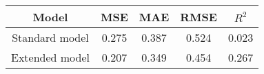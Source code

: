 \begin{tabular}{ccccc}
  \toprule
  \textbf{Model} & \textbf{MSE} & \textbf{MAE} & \textbf{RMSE} & \textbf{\(R^2\)} \\\midrule
  Standard model & 0.275 & 0.387 & 0.524 & 0.023 \\
  Extended model & 0.207 & 0.349 & 0.454 & 0.267 \\\bottomrule
\end{tabular}
